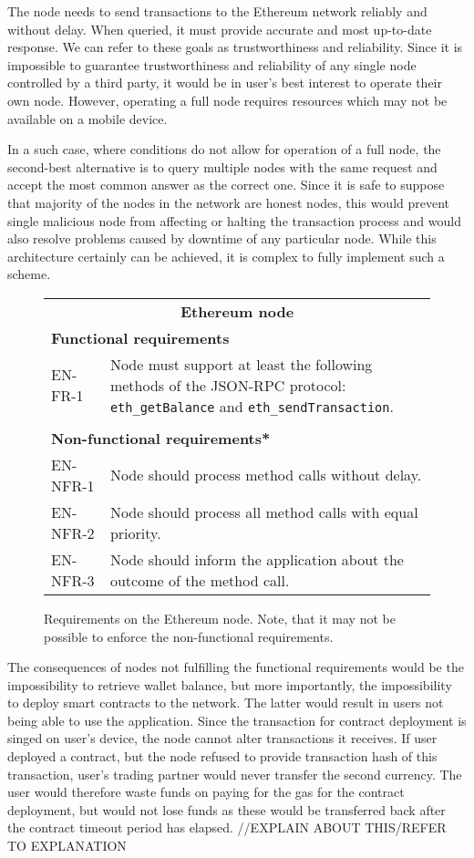 The node needs to send transactions to the Ethereum network reliably and without delay. When queried, it must provide accurate and most up-to-date response. We can refer to these goals as trustworthiness and reliability. Since it is impossible to guarantee trustworthiness and reliability of any single node controlled by a third party, it would be in user’s best interest to operate their own node. However, operating a full node requires resources which may not be available on a mobile device.

In a such case, where conditions do not allow for operation of a full node, the second-best alternative is to query multiple nodes with the same request and accept the most common answer as the correct one. Since it is safe to suppose that majority of the nodes in the network are honest nodes, this would prevent single malicious node from affecting or halting the transaction process and would also resolve problems caused by downtime of any particular node. While this architecture certainly can be achieved, it is complex to fully implement such a scheme. 

\begin{figure}[ht]
    \centering
    \begin{tabularx}{\textwidth}{|l X|}
        \hline
        \multicolumn{2}{|c|}{\textbf{Ethereum node}}\\
        \multicolumn{2}{|l|}{\textbf{Functional requirements}}\\
        EN-FR-1&Node must support at least the following methods of the JSON-RPC protocol: \texttt{eth\_getBalance} and \texttt{eth\_sendTransaction}.\\
        &\\
        \multicolumn{2}{|l|}{\textbf{Non-functional requirements*}}\\
        EN-NFR-1&Node should process method calls without delay.\\
        EN-NFR-2&Node should process all method calls with equal priority.\\
        EN-NFR-3&Node should inform the application about the outcome of the method call.\\
        \hline
    \end{tabularx}
    \caption{Requirements on the Ethereum node. Note, that it may not be possible to enforce the non-functional requirements.}
    \label{fig:reqs-node}
\end{figure}

The consequences of nodes not fulfilling the functional requirements would be the impossibility to retrieve wallet balance, but more importantly, the impossibility to deploy smart contracts to the network. The latter would result in users not being able to use the application. Since the transaction for contract deployment is singed on user’s device, the node cannot alter transactions it receives. If user deployed a contract, but the node refused to provide transaction hash of this transaction, user’s trading partner would never transfer the second currency. The user would therefore waste funds on paying for the gas for the contract deployment, but would not lose funds as these would be transferred back after the contract timeout period has elapsed. //EXPLAIN ABOUT THIS/REFER TO EXPLANATION


